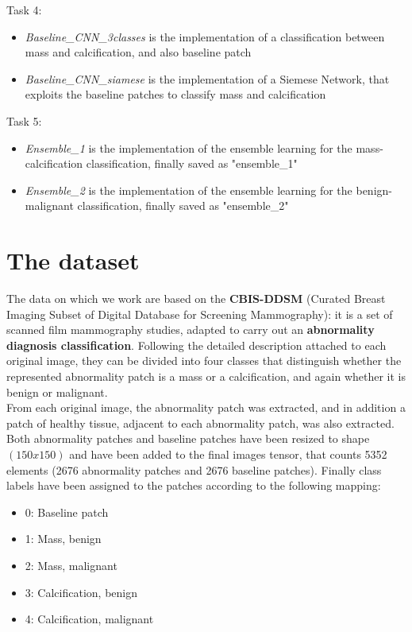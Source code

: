 \documentclass[11pt,a4paper,oneside]{article}
\begin{document}
Task 4:
\begin{itemize}
\item \textit{Baseline\_CNN\_3classes} is the implementation of a classification between mass and calcification, and also baseline patch
\item \textit{Baseline\_CNN\_siamese} is the implementation of a Siemese Network, that exploits the baseline patches to classify mass and calcification
\end{itemize}
Task 5:
\begin{itemize}
\item \textit{Ensemble\_1} is the implementation of the ensemble learning for the mass-calcification classification, finally saved as "ensemble\_1"
\item \textit{Ensemble\_2} is the implementation of the ensemble learning for the benign-malignant classification, finally saved as "ensemble\_2"
\end{itemize}


\section{The dataset}
The data on which we work are based on the \textbf{CBIS-DDSM} (Curated Breast Imaging Subset of Digital Database for Screening Mammography): it is a set of scanned film mammography studies, adapted to carry out an \textbf{abnormality diagnosis classification}. Following the detailed description attached to each original image, they can be divided into four classes that distinguish whether the represented abnormality patch is a mass or a calcification, and again whether it is benign or malignant. \\
From each original image, the abnormality patch was extracted, and in addition a patch of healthy tissue, adjacent to each abnormality patch, was also extracted. Both abnormality patches and baseline patches have been resized to shape $(150x150)$ and have been added to the final images tensor, that counts 5352 elements (2676 abnormality patches and 2676 baseline patches).
Finally class labels have been assigned to the patches according to the following mapping:
\begin{itemize}
\item 0: Baseline patch
\item 1: Mass, benign
\item 2: Mass, malignant
\item 3: Calcification, benign
\item 4: Calcification, malignant
\end{itemize}
\end{document}
